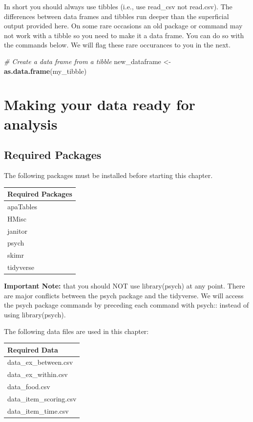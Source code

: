 \documentclass[
]{krantz}
\makeatletter
\newenvironment{Shaded}{\begin{snugshade}}{\end{snugshade}}
\newcommand{\CommentTok}[1]{\textcolor[rgb]{0.37,0.37,0.37}{\textit{#1}}}
\newcommand{\KeywordTok}[1]{\textcolor[rgb]{0.27,0.27,0.27}{\textbf{#1}}}
\newcommand{\NormalTok}[1]{#1}
\newcommand{\StringTok}[1]{\textcolor[rgb]{0.5,0.5,0.5}{#1}}
\newenvironment{kframe}{%
\medskip{}
\setlength{\fboxsep}{.8em}
 \def\at@end@of@kframe{}%
 \ifinner\ifhmode%
  \def\at@end@of@kframe{\end{minipage}}%
  \begin{minipage}{\columnwidth}%
 \fi\fi%
 \def\FrameCommand##1{\hskip\@totalleftmargin \hskip-\fboxsep
 \colorbox{shadecolor}{##1}\hskip-\fboxsep
     \hskip-\linewidth \hskip-\@totalleftmargin \hskip\columnwidth}%
 \MakeFramed {\advance\hsize-\width
   \@totalleftmargin\z@ \linewidth\hsize
   \@setminipage}}%
 {\par\unskip\endMakeFramed%
 \at@end@of@kframe}
\renewenvironment{Shaded}{\begin{kframe}}{\end{kframe}}
\makeatother
\begin{document}
In short you should always use tibbles (i.e., use read\_csv not read.csv). The differences between data frames and tibbles run deeper than the superficial output provided here. On some rare occasions an old package or command may not work with a tibble so you need to make it a data frame. You can do so with the commands below. We will flag these rare occurances to you in the next.

\begin{Shaded}
\begin{Highlighting}[]
\CommentTok{# Create a data frame from a tibble}
\NormalTok{new_dataframe <-}\StringTok{ }\KeywordTok{as.data.frame}\NormalTok{(my_tibble)}
\end{Highlighting}
\end{Shaded}

\hypertarget{making-your-data-ready-for-analysis}{%
\chapter{Making your data ready for analysis}\label{making-your-data-ready-for-analysis}}

\hypertarget{required-packages}{%
\section{Required Packages}\label{required-packages}}

The following packages must be installed before starting this chapter.

\begin{longtable}[]{@{}l@{}}
\toprule
Required Packages\tabularnewline
\midrule
\endhead
apaTables\tabularnewline
HMisc\tabularnewline
janitor\tabularnewline
psych\tabularnewline
skimr\tabularnewline
tidyverse\tabularnewline
\bottomrule
\end{longtable}

\textbf{Important Note:} that you should NOT use library(psych) at any point. There are major conflicts between the psych package and the tidyverse. We will access the psych package commands by preceding each command with psych:: instead of using library(psych).

The following data files are used in this chapter:

\begin{longtable}[]{@{}l@{}}
\toprule
Required Data\tabularnewline
\midrule
\endhead
data\_ex\_between.csv\tabularnewline
data\_ex\_within.csv\tabularnewline
data\_food.csv\tabularnewline
data\_item\_scoring.csv\tabularnewline
data\_item\_time.csv\tabularnewline
\bottomrule
\end{longtable}
\end{document}
